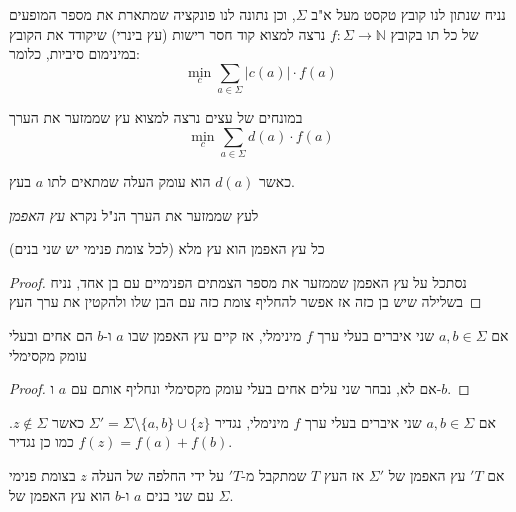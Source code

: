 נניח שנתון לנו קובץ טקסט מעל א"ב
$\Sigma$,
וכן נתונה לנו פונקציה שמתארת את מספר המופעים של כל תו בקובץ
$f:\Sigma \to \mathbb{N}$
נרצה למצוא קוד חסר רישות (עץ בינרי) שיקודד את הקובץ במינימום סיביות, כלומר:
$$
\min_c \sum_{a \in \Sigma}|c(a)| \cdot f(a)
$$

במונחים של עצים נרצה למצוא עץ שממזער את הערך
$$
\min_c \sum_{a \in \Sigma}d(a) \cdot f(a)
$$

כאשר 
$d(a)$
הוא עומק העלה שמתאים לתו $a$ בעץ.

לעץ שממזער את הערך הנ"ל נקרא 
\emph{עץ האפמן}

\begin{claim}
כל עץ האפמן הוא עץ מלא (לכל צומת פנימי יש שני בנים)
\end{claim}

\begin{proof}
נסתכל על עץ האפמן שממזער את מספר הצמתים הפנימיים עם בן אחד,
נניח בשלילה שיש בן כזה
אז אפשר להחליף צומת כזה עם הבן שלו ולהקטין את ערך העץ
\end{proof}

\begin{claim}
אם 
$a,b \in \Sigma$
שני איברים בעלי ערך 
$f$
מינימלי, 
אז קיים עץ האפמן שבו $a$ ו-$b$ הם אחים ובעלי עומק מקסימלי
\end{claim}

\begin{proof}
אם לא, נבחר שני עלים אחים בעלי עומק מקסימלי ונחליף אותם עם $a$ ו-$b$.
\end{proof}

\begin{lemma}
אם 
$a,b \in \Sigma$
שני איברים בעלי ערך 
$f$
מינימלי, 
נגדיר 
$\Sigma' = \Sigma \setminus \{a,b\} \cup \{z\}$
כאשר
$z \notin \Sigma$.
כמו כן נגדיר
$f(z) = f(a) + f(b)$.

אם $'T$ עץ האפמן של 
$\Sigma'$
אז העץ $T$ שמתקבל מ-$'T$ על ידי החלפה של העלה $z$ בצומת פנימי עם שני בנים $a$ ו-$b$ הוא עץ
האפמן של 
$\Sigma$.
\end{lemma}
